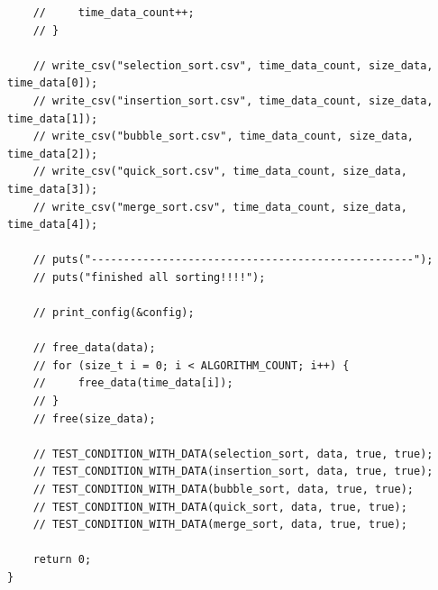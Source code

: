 \documentclass[dvipdfmx, a4paper, titlepage]{jsarticle}
\begin{document}
{\begin{verbatim}
    //     time_data_count++;
    // }

    // write_csv("selection_sort.csv", time_data_count, size_data, time_data[0]);
    // write_csv("insertion_sort.csv", time_data_count, size_data, time_data[1]);
    // write_csv("bubble_sort.csv", time_data_count, size_data, time_data[2]);
    // write_csv("quick_sort.csv", time_data_count, size_data, time_data[3]);
    // write_csv("merge_sort.csv", time_data_count, size_data, time_data[4]);

    // puts("--------------------------------------------------");
    // puts("finished all sorting!!!!");

    // print_config(&config);

    // free_data(data);
    // for (size_t i = 0; i < ALGORITHM_COUNT; i++) {
    //     free_data(time_data[i]);
    // }
    // free(size_data);

    // TEST_CONDITION_WITH_DATA(selection_sort, data, true, true);
    // TEST_CONDITION_WITH_DATA(insertion_sort, data, true, true);
    // TEST_CONDITION_WITH_DATA(bubble_sort, data, true, true);
    // TEST_CONDITION_WITH_DATA(quick_sort, data, true, true);
    // TEST_CONDITION_WITH_DATA(merge_sort, data, true, true);

    return 0;
}
\end{verbatim}
}

\end{document}
